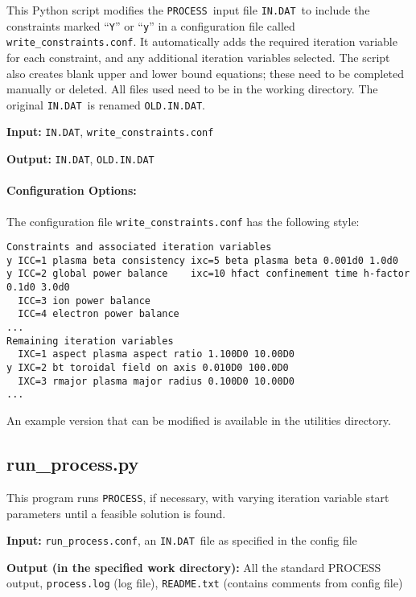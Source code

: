 \documentclass[11pt,a4paper]{report}
\newcommand{\indat}{\mbox{\texttt{IN.DAT}}}
\newcommand{\process}{\mbox{\texttt{PROCESS}}}
\begin{document}
This Python script modifies the \process\ input file \indat\ to include the
constraints marked ``\texttt{Y}'' or ``\texttt{y}'' in a configuration file
called \texttt{write\_constraints.conf}. It automatically adds the required
iteration variable for each constraint, and any additional iteration variables
selected. The script also creates blank upper and lower bound equations; these
need to be completed manually or deleted. All files used need to be in the
working directory. The original \indat\ is renamed \texttt{OLD.IN.DAT}.

\begin{description}
\item{\textbf{Input:}}
\indat, \texttt{write\_constraints.conf}
                                
\item{\textbf{Output:}}
\indat, \texttt{OLD.IN.DAT}
\end{description}

\paragraph{Configuration Options:}

The configuration file \texttt{write\_constraints.conf} has the following style:
\begin{framed}
\begin{verbatim}
Constraints and associated iteration variables
y ICC=1 plasma beta consistency ixc=5 beta plasma beta 0.001d0 1.0d0
y ICC=2 global power balance    ixc=10 hfact confinement time h-factor 0.1d0 3.0d0
  ICC=3 ion power balance                                            
  ICC=4 electron power balance 
...
Remaining iteration variables
  IXC=1 aspect plasma aspect ratio 1.100D0 10.00D0
y IXC=2 bt toroidal field on axis 0.010D0 100.0D0
  IXC=3 rmajor plasma major radius 0.100D0 10.00D0
...
\end{verbatim}
\end{framed}
An example version that can be modified is available in the utilities directory.

\subsection{run\_process.py}

This program runs \process, if necessary, with varying iteration variable
start parameters until a feasible solution is found.

\begin{description}
\item{\textbf{Input:}}
\texttt{run\_process.conf}, an \indat\ file as specified in the config file
                                
\item{\textbf{Output (in the specified work directory):}} All the standard
  PROCESS output, \texttt{process.log} (log file), \texttt{README.txt}
  (contains comments from config file)
\end{description}
\end{document}
